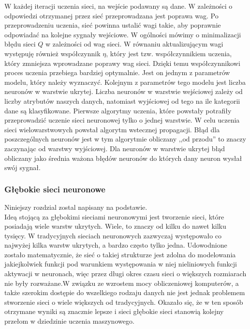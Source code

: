 
W każdej iteracji uczenia sieci, na wejście podawany są dane. W zależności o odpowiedzi otrzymanej przez sieć przeprowadzana jest poprawa wag. Po przeprowadzeniu uczenia, sieć powinna ustalić wagi takie, aby poprawnie odpowiadać na kolejne sygnały wejściowe. W ogólności mówimy o minimalizacji błędu sieci $Q$ w zależności od wag sieci. W równaniu aktualizującym wagi występuję również współczynnik $\eta$, który jest tzw. współczynnikiem uczenia, który zmniejsza wprowadzane poprawy wag sieci. Dzięki temu współczynnikowi proces uczenia przebiega bardziej optymalnie. Jest on jednym z parametrów modelu, który należy wyznaczyć. Kolejnym z parametrów tego modelu jest liczba neuronów w warstwie ukrytej. Liczba neuronów w warstwie wejściowej zależy od liczby atrybutów naszych danych, natomiast wyjściowej od tego na ile kategorii dane są klasyfikowane. Pierwsze algorytmy uczenia, które powstały potrafiły przeprowadzić uczenie sieci neuronowej tylko o jednej warstwie. W celu uczenia sieci wielowarstwowych powstał algorytm wstecznej propagacji. Błąd dla poszczególnych neuronów jest w tym algorytmie obliczany ,,od przodu'' to znaczy zaczynając od warstwy wyjściowej. Dla neuronów w warstwie ukrytej błąd obliczany jako średnia ważona błędów neuronów do których dany neuron wysłał swój sygnał.
\subsubsection{Głębokie sieci neuronowe}\label{dnn}
Niniejszy rozdzial zostal napisany na podstawie\cite{dnn1}.\\
Ideą stojącą za głębokimi sieciami neuronowymi jest tworzenie sieci, które posiadają wiele warstw ukrytych. Wiele, to znaczy od kilku do nawet kilku tysięcy. W tradycyjnych sieciach neuronowych zazwyczaj występowało co najwyżej kilka warstw ukrytych, a bardzo często tylko jedna. Udowodnione zostało matematycznie, że sieć o takiej strukturze jest zdolna do modelowania jakiejkolwiek funkcji pod warunkiem występowania w niej nieliniowych funkcji aktywacji w neuronach, więc przez długi okres czasu sieci o większych rozmiarach nie były rozważane.W związku ze wzrostem mocy obliczeniowej komputerów, a także szerokim dostępie do wszelkiego rodzaju danych nie jest jednak problemem stworzenie sieci o wiele większych od tradycyjnych. Okazało się, że w ten sposób otrzymane wyniki są znacznie lepsze i sieci głębokie sieci stanowią kolejny przełom w dziedzinie uczenia maszynowego.

